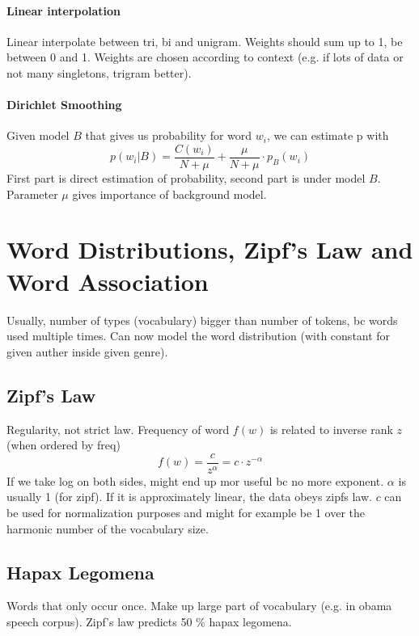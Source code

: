 \documentclass[11pt]{article}
\begin{document}
\paragraph{Linear interpolation}
Linear interpolate between tri, bi and unigram. Weights should sum up to 1, be between 0 and 1.
Weights are chosen according to context (e.g. if lots of data or not many singletons, trigram better). 
\paragraph{Dirichlet Smoothing}
Given model $B$ that gives us probability for word $w_i$, we can estimate p with
\begin{equation}
	p(w_i|B) = \frac{C(w_i)}{N + \mu} + \frac{\mu}{N + \mu}\cdot p_B(w_i)
\end{equation}
First part is direct estimation of probability, second part is under model $B$. Parameter $\mu$ gives
importance of background model.

\section{Word Distributions, Zipf's Law and Word Association}
Usually, number of types (vocabulary) bigger than number of tokens, bc words used multiple times.
Can now model the word distribution (with constant for given auther inside given genre).

\subsection{Zipf's Law}
Regularity, not strict law. Frequency of word $f(w)$ is related to inverse rank $z$ (when ordered by freq)
\begin{equation}
	f(w) = \frac{c}{z^\alpha} = c \cdot z^{-\alpha}
\end{equation}
If we take log on both sides, might end up mor useful bc no more exponent. $\alpha$ is usually 1 (for zipf).
If it is approximately linear, the data obeys zipfs law. $c$ can be used for normalization purposes
and might for example be 1 over the harmonic number of the vocabulary size.

\subsection{Hapax Legomena}
Words that only occur once. Make up large part of vocabulary (e.g. in obama speech corpus). Zipf's
law predicts 50 \% hapax legomena. 
\end{document}
